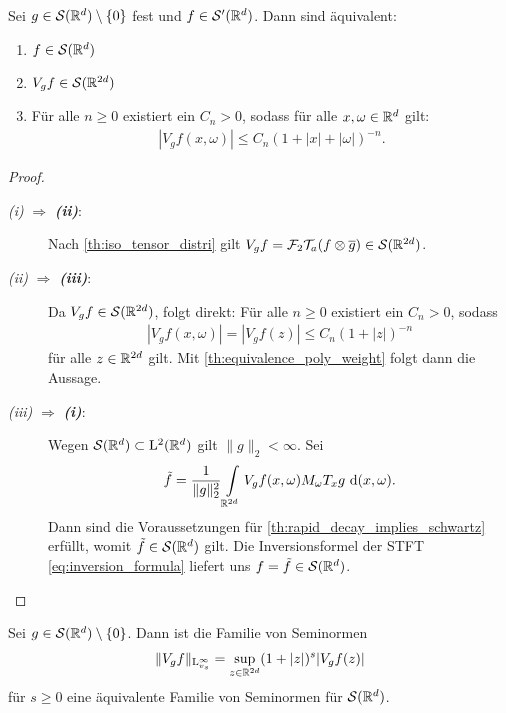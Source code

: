 \begin{sz}\label{th:equivalence_STFT_bounded}
	Sei $ g \in \mathcal{S}(\mathbb{R}^d) \setminus \{0\} $ fest und $ f \in \mathcal{S}^\prime(\mathbb{R}^d) $.
	Dann sind äquivalent:
	\begin{enumerate}[label =\textbf{(\roman*)}]
		\item $ f \in \mathcal{S}(\mathbb{R}^d) $
		\item $ V_g f \in \mathcal{S}(\mathbb{R}^{2d}) $
		\item Für alle $ n \geq 0 $ existiert ein $ C_n > 0 $, sodass
		für alle $ x, \omega \in \mathbb{R}^d $ gilt:
		\begin{align}
		| V_g f(x,\omega) | 
		\leq 
		C_n (1 + |x| + | \omega|)^{-n}.
		\end{align}
	\end{enumerate}
\end{sz}

\begin{proof}
	\begin{description}
		\item[\textit{ \itshape\textrm{(i)}} $ \Rightarrow $ \textbf{\textit{\textrm{(ii)}}}:]
		Nach \ref{th:iso_tensor_distri} gilt $ V_g f = \mathcal{F}_2 \mathcal{T}_a (f \otimes \overline{g}) \in \mathcal{S}(\mathbb{R}^{2d})  $.
		\item[\textit{ \itshape\textrm{(ii)}} $ \Rightarrow $ \textbf{\textit{\textrm{(iii)}}}:]
		Da $ V_g f \in \mathcal{S}(\mathbb{R}^{2d}) $, folgt direkt: Für alle $ n \geq 0 $ existiert ein $ C_n > 0 $, sodass
		\begin{align*}
		| V_g f(x,\omega)| = |V_g f (z)| 
		\leq 
		C_n(1+ |z|)^{-n}
		\end{align*}
		für alle $ z \in \mathbb{R}^{2d} $ gilt. Mit \ref{th:equivalence_poly_weight} folgt dann die Aussage.
		\item[\textit{ \itshape\textrm{(iii)}} $ \Rightarrow $ \textbf{\textit{\textrm{(i)}}}:]
		Wegen $ \mathcal{S}(\mathbb{R}^d) \subset \mathrm{L}^2(\mathbb{R}^d) $ gilt $ \|g \|_2 < \infty .$
		Sei 
		\begin{align*}
		\tilde{f} = \frac{1}{\|g \|_2^2}
		\int \limits_{\mathbb{R}^{2d}}
		V_g f(x,\omega) M_\omega T_x g \text{ d} (x,\omega).
		\end{align*}
		Dann sind die Voraussetzungen für \ref{th:rapid_decay_implies_schwartz} erfüllt, womit $ \tilde{f} \in \mathcal{S}(\mathbb{R}^d) $ gilt. Die Inversionsformel der STFT \eqref{eq:inversion_formula} liefert uns $ f = \tilde{f} \in \mathcal{S}(\mathbb{R}^d) $.
	\end{description}
\end{proof}

\begin{lem}\label{th:equivalence_seminorms}
	Sei $ g \in \mathcal{S}(\mathbb{R}^d) \setminus \{ 0\}$. Dann ist die Familie von Seminormen
	\begin{align}\label{eq:equivalence_seminorms_1}
	\| V_g f \|_{\mathrm{L}^\infty_{v_s}} 
	= 
	\sup \limits_{z \in \mathbb{R}^{2d}} (1 + |z|)^s |V_g f(z) |
	\end{align}
	für $ s \geq 0  $ eine äquivalente Familie von Seminormen für $ \mathcal{S}(\mathbb{R}^d) $.
\end{lem}

